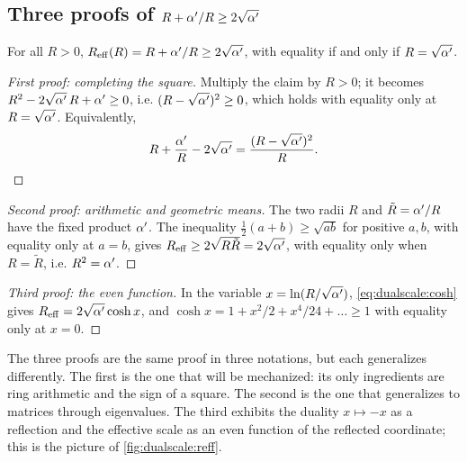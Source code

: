 \subsection{Three proofs of \texorpdfstring{$R+\alpha'/R\ge2\sqrt{\alpha'}$}{R + a'/R >= 2 sqrt(a')}}

\begin{proposition}\label{thm:dualscale:circle}
For all $R>0$, $R_{\rm eff}(R)=R+\alpha'/R\ge2\sqrt{\alpha'}$, with equality if and only if
$R=\sqrt{\alpha'}$.
\end{proposition}

\begin{proof}[First proof: completing the square]
Multiply the claim by $R>0$; it becomes $R^2-2\sqrt{\alpha'}\,R+\alpha'\ge0$, i.e.
$(R-\sqrt{\alpha'})^2\ge0$, which holds with equality only at $R=\sqrt{\alpha'}$. Equivalently,
\begin{equation}\label{eq:dualscale:square}
 R+\frac{\alpha'}{R}-2\sqrt{\alpha'}=\frac{(R-\sqrt{\alpha'})^2}{R}.
\end{equation}
\end{proof}

\begin{proof}[Second proof: arithmetic and geometric means]
The two radii $R$ and $\tilde R=\alpha'/R$ have the fixed product $\alpha'$. The inequality
$\frac12(a+b)\ge\sqrt{ab}$ for positive $a,b$, with equality only at $a=b$, gives
$R_{\rm eff}\ge2\sqrt{R\tilde R}=2\sqrt{\alpha'}$, with equality only when $R=\tilde R$, i.e.
$R^2=\alpha'$.
\end{proof}

\begin{proof}[Third proof: the even function]
In the variable $x=\ln(R/\sqrt{\alpha'})$, \eqref{eq:dualscale:cosh} gives
$R_{\rm eff}=2\sqrt{\alpha'}\cosh x$, and $\cosh x=1+x^2/2+x^4/24+\dots\ge1$ with equality only at
$x=0$.
\end{proof}

The three proofs are the same proof in three notations, but each generalizes differently. The
first is the one that will be mechanized: its only ingredients are ring arithmetic and the sign
of a square. The second is the one that generalizes to matrices through eigenvalues. The third
exhibits the duality $x\mapsto-x$ as a reflection and the effective scale as an even function
of the reflected coordinate; this is the picture of \cref{fig:dualscale:reff}.

